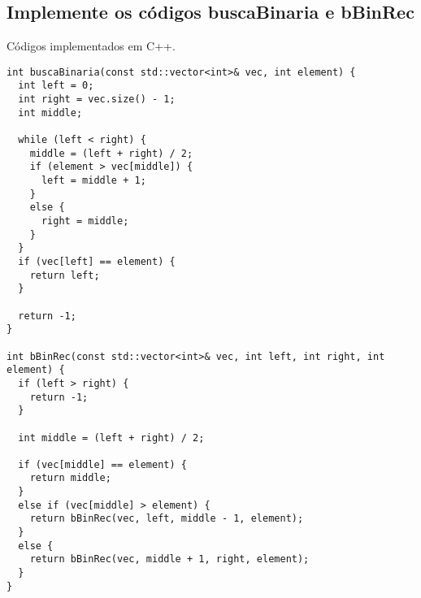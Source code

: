 \subsection{Implemente os códigos buscaBinaria e bBinRec}

Códigos implementados em C++.
\begin{verbatim}
int buscaBinaria(const std::vector<int>& vec, int element) {
  int left = 0;
  int right = vec.size() - 1;
  int middle;

  while (left < right) {
    middle = (left + right) / 2; 
    if (element > vec[middle]) {
      left = middle + 1;
    }
    else {
      right = middle;
    }
  }
  if (vec[left] == element) {
    return left;
  }

  return -1;
}

int bBinRec(const std::vector<int>& vec, int left, int right, int element) {
  if (left > right) {
    return -1;
  }

  int middle = (left + right) / 2;

  if (vec[middle] == element) {
    return middle;
  }
  else if (vec[middle] > element) {
    return bBinRec(vec, left, middle - 1, element);
  }
  else {
    return bBinRec(vec, middle + 1, right, element);
  }
}

\end{verbatim}
